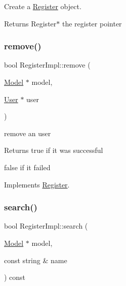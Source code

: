 Create a \hyperlink{classRegister}{Register} object. 

\begin{DoxyReturn}{Returns}
Register$\ast$ the register pointer 
\end{DoxyReturn}
\mbox{\label{classRegisterImpl_a528ea874f5607abfea9fea4b8cab1628}} 
\subsubsection{\texorpdfstring{remove()}{remove()}}
{\footnotesize\ttfamily bool Register\+Impl\+::remove (\begin{DoxyParamCaption}\item[{\hyperlink{classModel}{Model} $\ast$}]{model,  }\item[{\hyperlink{classUser}{User} $\ast$}]{user }\end{DoxyParamCaption})\hspace{0.3cm}{\ttfamily [virtual]}}



remove an user 

\begin{DoxyReturn}{Returns}
true if it was successful 

false if it failed 
\end{DoxyReturn}


Implements \hyperlink{classRegister_a09d7d6c24f7c07e97f7ef2d24a057f73}{Register}.

\mbox{\label{classRegisterImpl_ad60a7330160adae90443acb547398bd9}} 
\subsubsection{\texorpdfstring{search()}{search()}}
{\footnotesize\ttfamily bool Register\+Impl\+::search (\begin{DoxyParamCaption}\item[{\hyperlink{classModel}{Model} $\ast$}]{model,  }\item[{const string \&}]{name }\end{DoxyParamCaption}) const\hspace{0.3cm}{\ttfamily [virtual]}}



